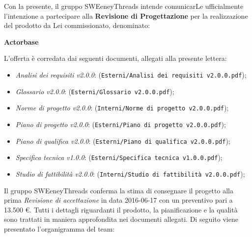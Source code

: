 \documentclass[a4paper]{article}
\begin{document}
	\vspace{5mm}Con la presente, il gruppo SWEeneyThreads intende comunicarLe ufficialmente l'intenzione a partecipare 
    alla \textbf{Revisione di Progettazione} per la realizzazione del prodotto da Lei commissionato, denominato: 
    \newline \newline
	\centerline{\textbf{Actorbase}}
	\newline \newline
	L'offerta è corredata dai seguenti documenti, allegati alla presente lettera:
	\begin{itemize}
		\item \emph{Analisi dei requisiti v2.0.0}: (\verb|Esterni/Analisi dei requisiti v2.0.0.pdf|);
		\item \emph{Glossario v2.0.0}: (\verb|Esterni/Glossario v2.0.0.pdf|);
		\item \emph{Norme di progetto v2.0.0}: (\verb|Interni/Norme di progetto v2.0.0.pdf|);
		\item \emph{Piano di progetto v2.0.0}: (\verb|Esterni/Piano di progetto v2.0.0.pdf|);
		\item \emph{Piano di qualifica v2.0.0}: (\verb|Esterni/Piano di qualifica v2.0.0.pdf|);
		\item \emph{Specifica tecnica v1.0.0}: (\verb|Esterni/Specifica tecnica v1.0.0.pdf|);
		\item \emph{Studio di fattibilità v2.0.0}: (\verb|Interni/Studio di fattibilità v2.0.0.pdf|);
	\end{itemize}
	Il gruppo SWEeneyThreads conferma la stima di consegnare il progetto alla prima \emph{Revisione di accettazione}
	in data 2016-06-17 con un preventivo pari a 13.500 \euro .
	Tutti i dettagli riguardanti il prodotto, la pianificazione e la qualità sono trattati in maniera approfondita 
	nei documenti allegati.
	\newpage
	Di seguito viene presentato l’organigramma del team:
\end{document}
